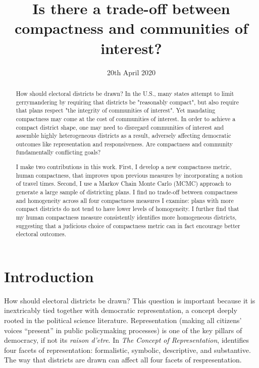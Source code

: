 \documentclass[]{article}
\title{Is there a trade-off between compactness and communities of interest?}
\date{20th April 2020}
\begin{document}
\maketitle

\def\citeapos#1{\citeauthor{#1}'s (\citeyear{#1})}

\begin{abstract}
How should electoral districts be drawn? In the U.S.,
many states attempt to limit gerrymandering by requiring that districts be
"reasonably compact", but also require that plans respect "the integrity of
communities of interest". Yet mandating compactness may come at the cost
of communities of interest. In order to achieve a compact district shape, one
may need to disregard communities of interest and assemble highly heterogeneous
districts as a result, adversely affecting democratic outcomes like
representation and responsiveness. Are compactness and community fundamentally
conflicting goals?

I make two contributions in this work. First, I develop a new compactness
metric, human compactness, that improves upon previous measures by
incorporating a notion of travel times. Second, I use a Markov Chain Monte
Carlo (MCMC) approach to generate a large sample of districting plans. I find
no trade-off between compactness and homogeneity across all four compactness
measures I examine: plans with more compact districts do not tend to have lower
levels of homogeneity. I further find that my human compactness measure
consistently identifies more homogeneous districts, suggesting that a judicious
choice of compactness metric can in fact encourage better electoral outcomes.
\end{abstract}

\pagebreak{}

\tableofcontents{}

\pagebreak{}

\hypertarget{introduction}{%
\section{Introduction}\label{introduction}}

How should electoral districts be drawn? This question is important
because it is inextricably tied together with democratic representation,
a concept deeply rooted in the political science literature.
Representation (making all citizens' voices ``present'' in public
policymaking processes) is one of the key pillars of democracy, if not
its \emph{raison d'etre}. In \emph{The Concept of Representation},
\cite{pitkin} identifies four facets of representation: formalistic,
symbolic, descriptive, and substantive. The way that districts are drawn
can affect all four facets of respresentation.
\end{document}

